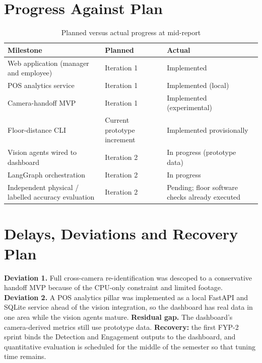 \section{Progress Against Plan}
\begin{table}[H]
\centering
\caption{Planned versus actual progress at mid-report}
\begin{tabular}{P{0.34\textwidth}P{0.2\textwidth}P{0.3\textwidth}}
\toprule
Milestone & Planned & Actual\\
\midrule
Web application (manager and employee) & Iteration 1 & Implemented\\
POS analytics service & Iteration 1 & Implemented (local)\\
Camera-handoff MVP & Iteration 1 & Implemented (experimental)\\
Floor-distance CLI & Current prototype increment & Implemented provisionally\\
Vision agents wired to dashboard & Iteration 2 & In progress (prototype data)\\
LangGraph orchestration & Iteration 2 & In progress\\
Independent physical / labelled accuracy evaluation & Iteration 2 & Pending; floor software checks already executed\\
\bottomrule
\end{tabular}
\end{table}

\section{Delays, Deviations and Recovery Plan}
\textbf{Deviation 1.} Full cross-camera re-identification was descoped to a conservative handoff MVP because of the CPU-only constraint and limited footage. \textbf{Deviation 2.} A POS analytics pillar was implemented as a local FastAPI and SQLite service ahead of the vision integration, so the dashboard has real data in one area while the vision agents mature. \textbf{Residual gap.} The dashboard's camera-derived metrics still use prototype data. \textbf{Recovery:} the first FYP-2 sprint binds the Detection and Engagement outputs to the dashboard, and quantitative evaluation is scheduled for the middle of the semester so that tuning time remains.
